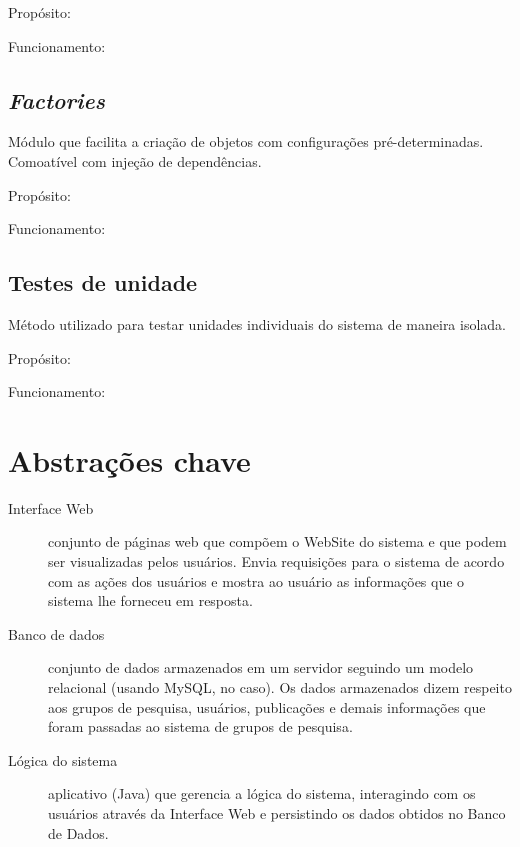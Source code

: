 \documentclass[11pt, a4paper]{article}
\begin{document}
            Propósito: %

            Funcionamento: %

        \subsection{\textit{Factories}}
            Módulo que facilita a criação de objetos com configurações
            pré-determinadas. Comoatível com injeção de dependências.

            Propósito: %

            Funcionamento: %

        \subsection{Testes de unidade}
            Método utilizado para testar unidades individuais do sistema de
            maneira isolada.

            Propósito: %

            Funcionamento: %

    \section{Abstrações chave}
        \begin{description}
            \item[Interface Web] conjunto de páginas web que compõem o WebSite
            do sistema e que podem ser visualizadas pelos usuários. Envia
            requisições para o sistema de acordo com as ações dos usuários e
            mostra ao usuário as informações que o sistema lhe forneceu em
            resposta.

            \item[Banco de dados] conjunto de dados armazenados em um servidor
            seguindo um modelo relacional (usando MySQL, no caso). Os dados
            armazenados dizem respeito aos grupos de pesquisa, usuários,
            publicações e demais informações que foram passadas ao sistema de
            grupos de pesquisa.

            \item[Lógica do sistema] aplicativo (Java) que gerencia a lógica do
            sistema, interagindo com os usuários através da Interface Web e
            persistindo os dados obtidos no Banco de Dados.
        \end{description}
\end{document}
